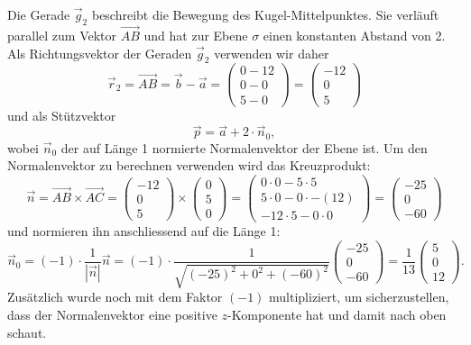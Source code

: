 \begin{loesung}
Die Gerade $\vec g_2$ beschreibt die Bewegung des Kugel-Mittelpunktes.
Sie verläuft parallel zum Vektor $\overrightarrow{ AB}$ und hat zur Ebene $\sigma$ 
einen konstanten Abstand von 2. Als Richtungsvektor der Geraden 
$\vec g_2$ verwenden wir daher
\[
  \vec r_2 = \overrightarrow{AB}= \vec b - \vec a =
  \begin{pmatrix}
   0-12\\ 
   0-0\\
   5-0
  \end{pmatrix}
  =  \begin{pmatrix}
   -12\\ 
   0\\
   5
  \end{pmatrix}
\]
und als Stützvektor
\[
\vec p = \vec a + 2\cdot \vec n_0,
\]
wobei $\vec n_0$ der auf Länge 1 normierte Normalenvektor der Ebene ist.
Um den Normalenvektor zu berechnen verwenden wird das Kreuzprodukt:
\[
 \vec n = \overrightarrow{AB}\times \overrightarrow{AC}
 = \begin{pmatrix} -12\\ 0\\ 5 \end{pmatrix}\times\begin{pmatrix} 0\\ 5\\ 0 \end{pmatrix}
 = \begin{pmatrix} 0\cdot 0 - 5\cdot 5\\ 5\cdot 0 - 0\cdot -(12)\\ -12\cdot 5 - 0\cdot 0 \end{pmatrix}
 = \begin{pmatrix} -25\\ 0 \\ -60 \end{pmatrix}
\]
und normieren ihn anschliessend auf die Länge 1:
\[
 \vec n_0 = (-1)\cdot \dfrac{1}{|\vec n|}\vec n
 = (-1)\cdot \dfrac{1}{\sqrt{(-25)^2+0^2+(-60)^2}}\begin{pmatrix} -25\\ 0 \\ -60 \end{pmatrix}
 = \dfrac{1}{13}\begin{pmatrix} 5\\ 0 \\ 12 \end{pmatrix}.
\]
Zusätzlich wurde noch mit dem Faktor $(-1)$ multipliziert, um sicherzustellen, dass
der Normalenvektor eine positive $z$-Komponente hat und damit nach oben schaut.

\end{loesung}
